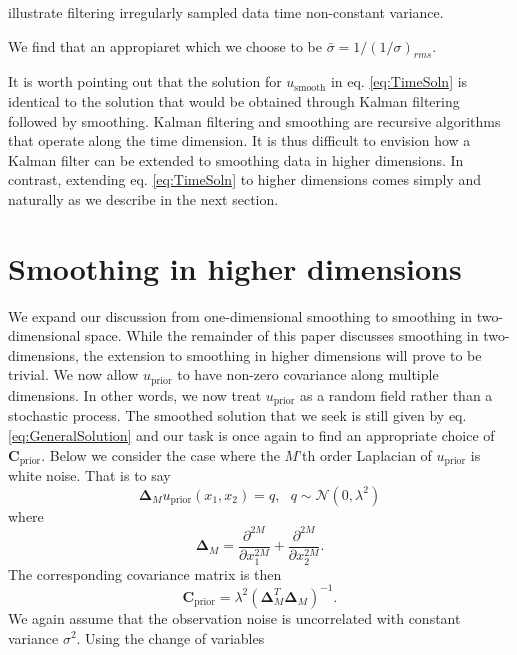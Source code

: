 \documentclass[10pt,a4paper]{article}
\begin{document}
illustrate filtering irregularly sampled data time non-constant variance.    

  We find that an appropiaret which we choose to be $\bar{\sigma} = 1/(1/\sigma)_{rms}$. 
  

It is worth pointing out that the solution for $u_\mathrm{smooth}$ in eq. \ref{eq:TimeSoln} is identical to the solution that would be obtained through Kalman filtering followed by smoothing. Kalman filtering and smoothing are recursive algorithms that operate along the time dimension.  It is thus difficult to envision how a Kalman filter can be extended to smoothing data in higher dimensions.  In contrast, extending eq. \ref{eq:TimeSoln} to higher dimensions comes simply and naturally as we describe in the next section.     

\section*{Smoothing in higher dimensions} 
We expand our discussion from one-dimensional smoothing to smoothing in two-dimensional space.  While the remainder of this paper discusses smoothing in two-dimensions, the extension to smoothing in higher dimensions will prove to be trivial.  We now allow $u_\mathrm{prior}$ to have non-zero covariance along multiple dimensions.  In other words, we now treat $u_\mathrm{prior}$ as a random field rather than a stochastic process.  The smoothed solution that we seek is still given by eq. \ref{eq:GeneralSolution} and our task is once again to find an appropriate choice of $\mathbf{C}_\mathrm{prior}$.  Below we consider the case where the $M$'th order Laplacian of $u_\mathrm{prior}$ is white noise.  That is to say
\begin{equation}
  \mathbf{\Delta}_M u_\mathrm{prior}(x_1,x_2) = q, \ \ \ q \sim \mathcal{N}(0,\lambda^2)
\end{equation}  
where 
\begin{equation}\label{Laplacian}
\mathbf{\Delta}_M = \frac{\partial^{2M}}{\partial x_1^{2M}} +
           \frac{\partial^{2M}}{\partial x_2^{2M}}.
\end{equation} 
The corresponding covariance matrix is then
\begin{equation}\label{Covariance2D}
\mathbf{C}_\mathrm{prior} = \lambda^2\left(\mathbf{\Delta}_M^T\mathbf{\Delta}_M\right)^{-1}. 
\end{equation}           
We again assume that the observation noise is uncorrelated with constant variance $\sigma^2$.  Using the change of variables
\end{document}
